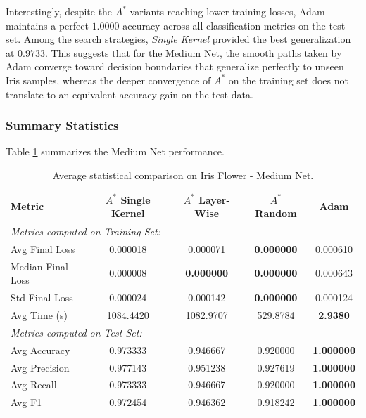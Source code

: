 Interestingly, despite the $A^*$ variants reaching lower training losses, Adam maintains a perfect $1.0000$ accuracy across all classification metrics on the test set. Among the search strategies, \textit{Single Kernel} provided the best generalization at $0.9733$. This suggests that for the Medium Net, the smooth paths taken by Adam converge toward decision boundaries that generalize perfectly to unseen Iris samples, whereas the deeper convergence of $A^*$ on the training set does not translate to an equivalent accuracy gain on the test data.
\subsubsection{Summary Statistics}

Table \ref{tab:medium_net_iris} summarizes the Medium Net performance.

\begin{table}[htbp]
\centering
\scriptsize
\begin{tabular}{|l|c|c|c|c|}
\hline
\textbf{Metric}   & \textbf{$A^*$ Single Kernel} & \textbf{$A^*$ Layer-Wise} & \textbf{$A^*$ Random} & \textbf{Adam} \\ \hline
\multicolumn{5}{|l|}{\textit{Metrics computed on Training Set:}} \\ \hline
Avg Final Loss          & 0.000018                     & 0.000071                  & \textbf{0.000000}     & 0.000610      \\ 
Median Final Loss       & 0.000008                     & \textbf{0.000000}         & \textbf{0.000000}     & 0.000643      \\
Std Final Loss          & 0.000024                     & 0.000142                  & \textbf{0.000000}     & 0.000124      \\ \hline
Avg Time (s)            & 1084.4420                    & 1082.9707                 & 529.8784              & \textbf{2.9380} \\ \hline
\multicolumn{5}{|l|}{\textit{Metrics computed on Test Set:}} \\ \hline
Avg Accuracy            & 0.973333                     & 0.946667                  & 0.920000              & \textbf{1.000000} \\ 
Avg Precision           & 0.977143                     & 0.951238                  & 0.927619              & \textbf{1.000000} \\ 
Avg Recall              & 0.973333                     & 0.946667                  & 0.920000              & \textbf{1.000000} \\ 
Avg F1                  & 0.972454                     & 0.946362                  & 0.918242              & \textbf{1.000000} \\ \hline
\end{tabular}
\caption{Average statistical comparison on Iris Flower - Medium Net.}
\label{tab:medium_net_iris}
\end{table}

